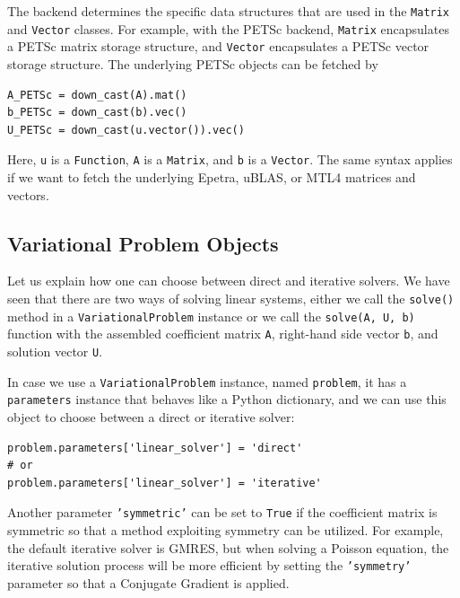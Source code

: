 The backend determines the specific data structures that are
used in the {\fontsize{12pt}{12pt}\texttt{Matrix}} and {\fontsize{12pt}{12pt}\texttt{Vector}} classes. For example,
with the PETSc backend, {\fontsize{12pt}{12pt}\texttt{Matrix}} encapsulates a
PETSc matrix storage structure, and
{\fontsize{12pt}{12pt}\texttt{Vector}} encapsulates a PETSc vector storage structure.
The underlying PETSc objects can be fetched by
\begin{Verbatim}[fontsize=\fontsize{10pt}{10pt},tabsize=8,baselinestretch=1.05,
fontfamily=tt,xleftmargin=7mm]
A_PETSc = down_cast(A).mat()
b_PETSc = down_cast(b).vec()
U_PETSc = down_cast(u.vector()).vec()
\end{Verbatim}
\noindent
Here, {\fontsize{12pt}{12pt}\texttt{u}} is a {\fontsize{12pt}{12pt}\texttt{Function}}, {\fontsize{12pt}{12pt}\texttt{A}} is a {\fontsize{12pt}{12pt}\texttt{Matrix}},
and {\fontsize{12pt}{12pt}\texttt{b}} is a {\fontsize{12pt}{12pt}\texttt{Vector}}.
The same syntax applies if we want to fetch
the underlying Epetra, uBLAS, or MTL4 matrices and vectors.

\subsection{Variational Problem Objects}

Let us explain how one can choose between direct and iterative solvers.
We have seen that there
are two ways of solving linear systems, either we call the {\fontsize{12pt}{12pt}\texttt{solve()}}
method in a {\fontsize{12pt}{12pt}\texttt{VariationalProblem}} instance or we call the {\fontsize{12pt}{12pt}\texttt{solve(A, U, b)}}
function with the assembled coefficient matrix {\fontsize{12pt}{12pt}\texttt{A}},
right-hand side vector {\fontsize{12pt}{12pt}\texttt{b}}, and
solution vector {\fontsize{12pt}{12pt}\texttt{U}}.

In case we use a {\fontsize{12pt}{12pt}\texttt{VariationalProblem}} instance, named {\fontsize{12pt}{12pt}\texttt{problem}},
it has a {\fontsize{12pt}{12pt}\texttt{parameters}} instance that behaves like a Python dictionary,
and we can use this object to choose between a direct or iterative
solver:
\begin{Verbatim}[fontsize=\fontsize{10pt}{10pt},tabsize=8,baselinestretch=1.05,
fontfamily=tt,xleftmargin=7mm]
problem.parameters['linear_solver'] = 'direct'
# or
problem.parameters['linear_solver'] = 'iterative'
\end{Verbatim}
\noindent
Another parameter {\fontsize{12pt}{12pt}\texttt{'symmetric'}} can be set to {\fontsize{12pt}{12pt}\texttt{True}}
if the coefficient matrix is symmetric so that
a method exploiting symmetry can be utilized.
For example, the default iterative solver is GMRES, but when solving
a Poisson equation, the iterative solution process will be more
efficient by setting the {\fontsize{12pt}{12pt}\texttt{'symmetry'}} parameter
so that a Conjugate Gradient is applied.


